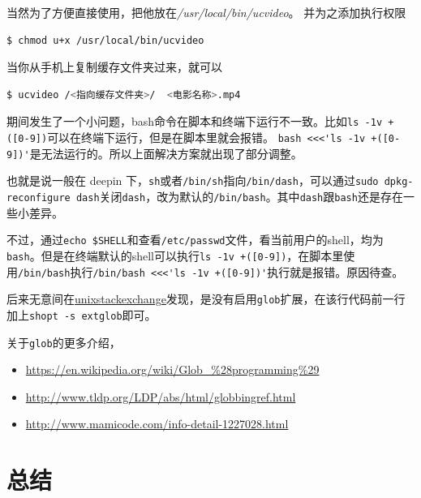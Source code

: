 \documentclass[doctor,openright,twoside]{sjtuthesis}
\providecommand{\tightlist}{%
    \setlength{\itemsep}{0pt}\setlength{\parskip}{0pt}}
\newcommand{\passthrough}[1]{#1}
\theoremstyle{plain}
\theoremstyle{definition}
\theoremstyle{remark}
\theoremstyle{ocrenumbox}
\theoremstyle{plain}
\begin{document}
当然为了方便直接使用，把他放在\emph{/usr/local/bin/ucvideo}。
并为之添加执行权限

\begin{lstlisting}[language=bash]
$ chmod u+x /usr/local/bin/ucvideo
\end{lstlisting}

当你从手机上复制缓存文件夹过来，就可以

\begin{lstlisting}[language=bash]
$ ucvideo /<指向缓存文件夹>/  <电影名称>.mp4
\end{lstlisting}

期间发生了一个小问题，bash命令在脚本和终端下运行不一致。比如\passthrough{\lstinline!ls -1v +([0-9])!}可以在终端下运行，但是在脚本里就会报错。
\passthrough{\lstinline!bash <<<'ls -1v +([0-9])'!}是无法运行的。所以上面解决方案就出现了部分调整。

也就是说一般在 deepin 下，\passthrough{\lstinline!sh!}或者\passthrough{\lstinline!/bin/sh!}指向\passthrough{\lstinline!/bin/dash!}，可以通过\passthrough{\lstinline!sudo dpkg-reconfigure dash!}关闭\passthrough{\lstinline!dash!}，改为默认的\passthrough{\lstinline!/bin/bash!}。其中\passthrough{\lstinline!dash!}跟\passthrough{\lstinline!bash!}还是存在一些小差异。

不过，通过\passthrough{\lstinline!echo $SHELL!}和查看\passthrough{\lstinline!/etc/passwd!}文件，看当前用户的shell，均为\passthrough{\lstinline!bash!}。但是在终端默认的shell可以执行\passthrough{\lstinline!ls -1v +([0-9])!}，在脚本里使用\passthrough{\lstinline!/bin/bash!}执行\passthrough{\lstinline!/bin/bash <<<'ls -1v +([0-9])'!}执行就是报错。原因待查。

后来无意间在\href{https://unix.stackexchange.com/questions/471937/how-does-this-work-ls-0-9}{unixstackexchange}发现，是没有启用\passthrough{\lstinline!glob!}扩展，在该行代码前一行加上\passthrough{\lstinline!shopt -s extglob!}即可。

关于\passthrough{\lstinline!glob!}的更多介绍，

\begin{itemize}
\tightlist
\item
  \url{https://en.wikipedia.org/wiki/Glob_\%28programming\%29}
\item
  \url{http://www.tldp.org/LDP/abs/html/globbingref.html}
\item
  \url{http://www.mamicode.com/info-detail-1227028.html}
\end{itemize}

\hypertarget{section-109}{%
\section{总结}\label{section-109}}
\end{document}
